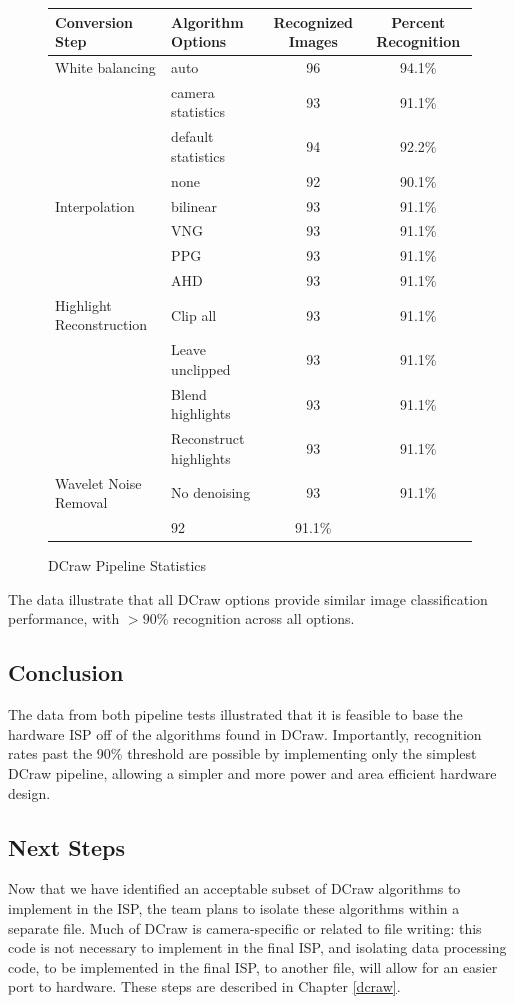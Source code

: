 \documentclass{report}
\begin{document}
\begin{figure}[!htb]
	\begin{center}
		\label{datapipeline}
		\caption{DCraw Pipeline Statistics}
		\begin{tabular}{llcc}
			Conversion Step & Algorithm Options & Recognized Images & Percent Recognition \\
			\hline
			White balancing & auto & 96 & 94.1\%\\
			& camera statistics & 93 & 91.1\%\\
			& default statistics & 94 & 92.2\%\\
			& none & 92 & 90.1\%\\
			Interpolation & bilinear & 93 & 91.1\%\\
			& VNG & 93 & 91.1\%\\
			& PPG & 93 & 91.1\%\\
			& AHD & 93 & 91.1\%\\
			Highlight Reconstruction & Clip all & 93 & 91.1\%\\
			& Leave unclipped & 93 & 91.1\%\\
			& Blend highlights & 93 & 91.1\%\\
			& Reconstruct highlights & 93 & 91.1\%\\
			Wavelet Noise Removal & No denoising & 93 & 91.1\%\\
			& 92 & 91.1\%
		\end{tabular}
	\end{center}
\end{figure}

The data illustrate that all DCraw options provide similar image classification performance, with $>90\%$ recognition across all options.

\subsection{Conclusion}
The data from both pipeline tests illustrated that it is feasible to base the hardware ISP off of the algorithms found in DCraw. Importantly, recognition rates past the 90\% threshold are possible by implementing only the simplest DCraw pipeline, allowing a simpler and more power and area efficient hardware design.
	
\subsection{Next Steps}
Now that we have identified an acceptable subset of DCraw algorithms to implement in the ISP, the team plans to isolate these algorithms within a separate file. Much of DCraw is camera-specific or related to file writing: this code is not necessary to implement in the final ISP, and isolating data processing code, to be implemented in the final ISP, to another file, will allow for an easier port to hardware. These steps are described in Chapter \ref{dcraw}.
\end{document}

